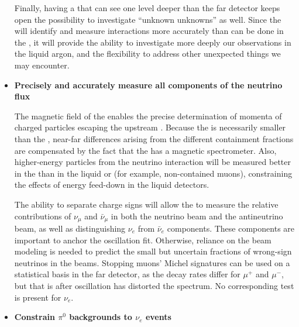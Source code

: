 \begin{itemize}
{Finally, having a  that can see one level deeper than the far detector keeps open the possibility to investigate ``unknown unknowns'' as well. Since the  will identify and measure interactions more accurately than can be done in the , it will provide the ability to investigate more deeply our observations in the liquid argon, and the flexibility to address other unexpected things we may encounter. 

}

\item {{\bf Precisely and accurately measure all components of the neutrino flux}  

The magnetic field of the  enables the precise determination of momenta of charged particles escaping the upstream .  
Because the  is necessarily smaller than the , near-far differences arising from the different containment fractions are compensated by the fact that the  has a magnetic spectrometer.  Also, higher-energy particles from the neutrino interaction will be measured better in the  than in the liquid  or  (for example, non-contained muons), constraining the effects of energy feed-down in the liquid detectors.

The ability to separate charge signs will allow the  to measure the relative contributions of $\nu_\mu$ and $\bar{\nu}_\mu$ in both the neutrino beam and the antineutrino beam, as well as distinguishing $\nu_e$ from $\bar{\nu}_e$ components.  These components are important to anchor the oscillation fit. Otherwise, reliance on the beam modeling is needed to predict the small but uncertain fractions of wrong-sign neutrinos in the beams.  Stopping muons' Michel signatures can be used on a statistical basis in the far detector, as the decay rates differ for $\mu^+$ and $\mu^-$, but that is after oscillation has distorted the spectrum.  No corresponding test is present for $\nu_e$.
}

\item {{\bf Constrain $\pi^0$ backgrounds to $\nu_e$ events}


}
\end{itemize}
